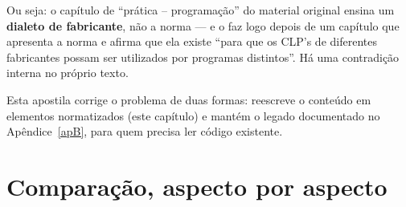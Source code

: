 Ou seja: o capítulo de ``prática -- programação'' do material original ensina um \textbf{dialeto de
fabricante}, não a norma --- e o faz logo depois de um capítulo que apresenta a norma e afirma que ela
existe ``para que os CLP's de diferentes fabricantes possam ser utilizados por programas distintos''.
Há uma contradição interna no próprio texto.

Esta apostila corrige o problema de duas formas: reescreve o conteúdo em elementos normatizados
(este capítulo) e mantém o legado documentado no Apêndice~\ref{apB}, para quem precisa ler código
existente.


\section{Comparação, aspecto por aspecto}

